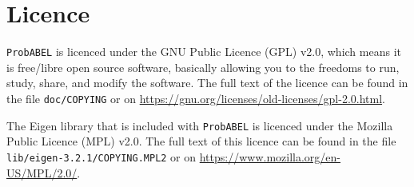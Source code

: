 \documentclass[12pt,a4paper]{article}
\newcommand{\PA}{\texttt{ProbABEL}}
\begin{document}




\section{Licence}
\PA{} is licenced under the GNU Public Licence (GPL) v2.0, which
means it is free/libre open source software, basically allowing you to
the freedoms to run, study, share, and modify the software. The full
text of the licence can be found in the file \lstinline{doc/COPYING}
or on \url{https://gnu.org/licenses/old-licenses/gpl-2.0.html}.

The Eigen library that is included with \PA{} is licenced under the
Mozilla Public Licence (MPL) v2.0. The full text of this licence can
be found in the file \lstinline{lib/eigen-3.2.1/COPYING.MPL2} or on
\url{https://www.mozilla.org/en-US/MPL/2.0/}.

\printindex
\end{document}
